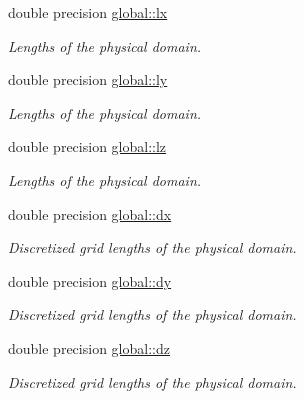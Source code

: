 \textbf{ }\par
\begin{DoxyCompactItemize}
\item 
double precision \mbox{\hyperlink{namespaceglobal_ac5d2ea39fc192fbb8354e665dc91b759}{global\+::lx}}
\begin{DoxyCompactList}\small\item\em Lengths of the physical domain. \end{DoxyCompactList}\item 
double precision \mbox{\hyperlink{namespaceglobal_a6a6ee40bbab9e114aa217f7d8570b924}{global\+::ly}}
\begin{DoxyCompactList}\small\item\em Lengths of the physical domain. \end{DoxyCompactList}\item 
double precision \mbox{\hyperlink{namespaceglobal_a9d90050855b894304d8b4272c6a9ee71}{global\+::lz}}
\begin{DoxyCompactList}\small\item\em Lengths of the physical domain. \end{DoxyCompactList}\end{DoxyCompactItemize}

\textbf{ }\par
\begin{DoxyCompactItemize}
\item 
double precision \mbox{\hyperlink{namespaceglobal_a9c5f8c3cf5f9b496608059fc13776b4c}{global\+::dx}}
\begin{DoxyCompactList}\small\item\em Discretized grid lengths of the physical domain. \end{DoxyCompactList}\item 
double precision \mbox{\hyperlink{namespaceglobal_aa2d01c0b9c06af88ae13136658fc3dd9}{global\+::dy}}
\begin{DoxyCompactList}\small\item\em Discretized grid lengths of the physical domain. \end{DoxyCompactList}\item 
double precision \mbox{\hyperlink{namespaceglobal_a4015487c561985eefa8cabc39f591540}{global\+::dz}}
\begin{DoxyCompactList}\small\item\em Discretized grid lengths of the physical domain. \end{DoxyCompactList}\end{DoxyCompactItemize}



